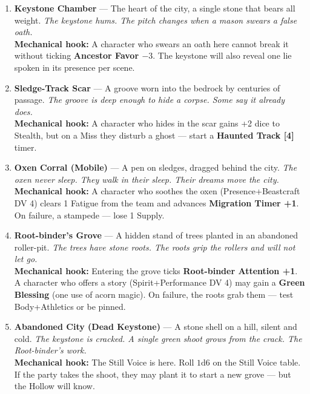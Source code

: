 \begin{enumerate}
\item \textbf{Keystone Chamber} --- The heart of the city, a single stone that bears all weight.
  \hfill \textit{The keystone hums. The pitch changes when a mason swears a false oath.} \\
  \textbf{Mechanical hook:} A character who swears an oath here cannot break it without ticking \textbf{Ancestor Favor $-3$}. The keystone will also reveal one lie spoken in its presence per scene.

\item \textbf{Sledge-Track Scar} --- A groove worn into the bedrock by centuries of passage.
  \hfill \textit{The groove is deep enough to hide a corpse. Some say it already does.} \\
  \textbf{Mechanical hook:} A character who hides in the scar gains +2 dice to Stealth, but on a Miss they disturb a ghost --- start a \textbf{Haunted Track [4]} timer.

\item \textbf{Oxen Corral (Mobile)} --- A pen on sledges, dragged behind the city.
  \hfill \textit{The oxen never sleep. They walk in their sleep. Their dreams move the city.} \\
  \textbf{Mechanical hook:} A character who soothes the oxen (Presence+Beastcraft DV 4) clears 1 Fatigue from the team and advances \textbf{Migration Timer +1}. On failure, a stampede --- lose 1 Supply.

\item \textbf{Root-binder's Grove} --- A hidden stand of trees planted in an abandoned roller-pit.
  \hfill \textit{The trees have stone roots. The roots grip the rollers and will not let go.} \\
  \textbf{Mechanical hook:} Entering the grove ticks \textbf{Root-binder Attention +1}. A character who offers a story (Spirit+Performance DV 4) may gain a \textbf{Green Blessing} (one use of acorn magic). On failure, the roots grab them --- test Body+Athletics or be pinned.

\item[J] \textbf{Abandoned City (Dead Keystone)} --- A stone shell on a hill, silent and cold.
  \hfill \textit{The keystone is cracked. A single green shoot grows from the crack. The Root-binder's work.} \\
  \textbf{Mechanical hook:} The Still Voice is here. Roll $1\text{d}6$ on the Still Voice table. If the party takes the shoot, they may plant it to start a new grove --- but the Hollow will know.


\end{enumerate}
